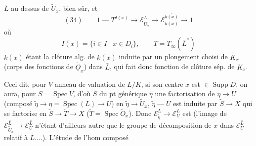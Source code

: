 $\bar L$ au dessus de $\tilde U_x$, bien sûr, et
\[
 (34)\qquad
 1\mathrel{\text{---}}T^{I(x)}\longrightarrow
 \mathcal E_{\tilde U_x}^{\bar L}\longrightarrow
 \mathcal E_{k(x)}^{\overline{k(x)}}\longrightarrow 1
\]
où 
\[
 I(x)=\{i\in I\mid x\in D_i\},\qquad T=T_\infty(\bar L^*)
\]
$\overline{k(x)}$ étant la clôture alg. de $k(x)$ induite par un plongement choisi de $\tilde K_x$ (corps des fonctions de $\widetilde{\underline{O}}_x$) dans $\bar L$, qui fait donc fonction  de clôture sép. de $K_x$.

Ceci dit, pour $V$ anneau de valuation de $L/K$, si son centre $x$  est $\in\operatorname{Supp}D$, on aura, pour $S=\operatorname{Spec}V$, d'où $\tilde S$  du pt générique $\tilde\eta$ une factorisation de $\tilde\eta\longrightarrow U$ (composé $\tilde\eta\longrightarrow\eta=\operatorname{Spec}(L)\longrightarrow U$) en $\tilde\eta\longrightarrow\tilde U_x$,  $\tilde\eta\mathrel{\text{---}}U$ est induite par $\tilde S\longrightarrow X$ qui se factorise en $\tilde S\longrightarrow\tilde T\longrightarrow X$ ($\tilde T=\operatorname{Spec}\tilde O_x$). Donc   $\mathcal E_{\tilde\eta}^{L}\longrightarrow\mathcal E_U^{L}$ est  
(l'image de $\mathcal E_{\tilde U_x}^{\bar L}\longrightarrow\mathcal E_U^{\bar L}$ n'étant d'ailleurs autre que le groupe de décomposition de $x$ dans $\mathcal E_U^{\bar L}$ relatif à $\bar L$....). L'étude de l'hom composé
